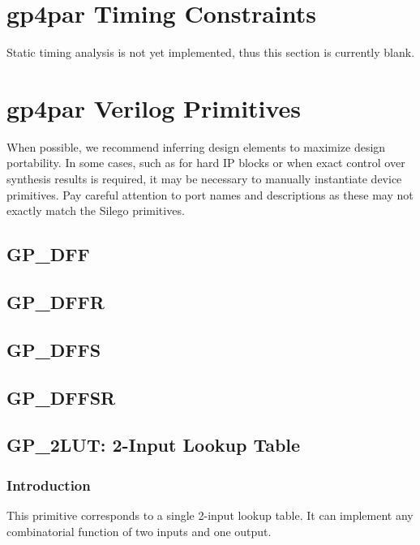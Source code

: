 \documentclass{article}
\begin{document}

\pagebreak
\section{gp4par Timing Constraints}

Static timing analysis is not yet implemented, thus this section is currently blank.


\pagebreak
\section{gp4par Verilog Primitives}

When possible, we recommend inferring design elements to maximize design portability. In some cases, such as for hard 
IP blocks or when exact control over synthesis results is required, it may be necessary to manually instantiate device 
primitives. Pay careful attention to port names and descriptions as these may not exactly match the Silego primitives.

\subsection{GP\_DFF}
\subsection{GP\_DFFR}
\subsection{GP\_DFFS}
\subsection{GP\_DFFSR}


\pagebreak
\subsection{GP\_2LUT: 2-Input Lookup Table}

\subsubsection{Introduction}
This primitive corresponds to a single 2-input lookup table. It can implement any combinatorial function of two 
inputs and one output.
\end{document}
